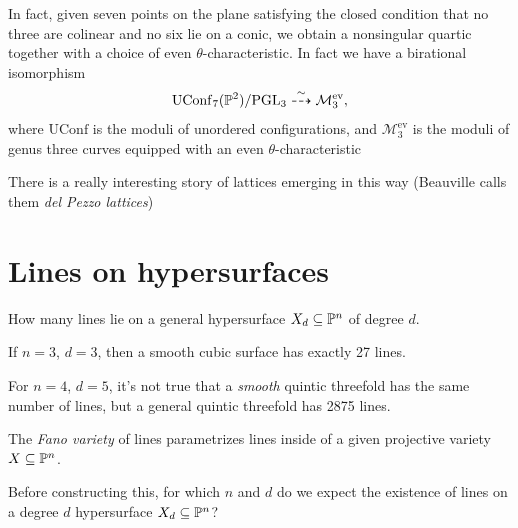 \documentclass[11pt]{amsart}
\providecommand{\UConf}{\mathrm{UConf}}
\begin{document}
In fact, given seven points on the plane satisfying the closed condition that no three are colinear and no six lie on a conic, we obtain a nonsingular quartic together with a choice of even $\theta$-characteristic. In fact we have a birational isomorphism
\begin{align*}
    \UConf_7(\P^2)/\PGL_3 \overset{\sim}{\dashto} \mathcal{M}_3^\text{ev},
\end{align*}
where $\UConf$ is the moduli of unordered configurations, and $\mathcal{M}_3^\text{ev}$ is the moduli of genus three curves equipped with an even $\theta$-characteristic \cite[6.3.12]{Dolgachev}

\begin{remark} There is a really interesting story of lattices emerging in this way (Beauville calls them \textit{del Pezzo lattices}) \cite{Beauville_delPezzo_lattices}
\end{remark}


\section{Lines on hypersurfaces}

\begin{question} How many lines lie on a general hypersurface $X_d \subseteq \P^n$ of degree $d$.
\end{question}

If $n=3$, $d=3$, then a smooth cubic surface has exactly 27 lines.

For $n=4$, $d=5$, it's not true that a \textit{smooth} quintic threefold has the same number of lines, but a general quintic threefold has 2875 lines.

The \textit{Fano variety} of lines parametrizes lines inside of a given projective variety $X \subseteq \P^n$.

\begin{question} Before constructing this, for which $n$ and $d$ do we expect the existence of lines on a degree $d$ hypersurface $X_d \subseteq \P^n$?
\end{question}
\end{document}
